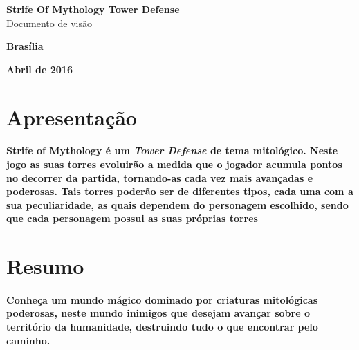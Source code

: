 \documentclass[11pt]{article} %
\begin{document}
\color{white}
\pagestyle{plain}

\begin{titlepage}
 \vfill
  \begin{center}
   {\textbf{{{\Huge  Strife Of Mythology Tower Defense}}}}\\[6cm]


   {{\huge Documento de visão}}\\[6cm]

   \hspace{.45\textwidth} %
  \vfill

\vspace{2cm}

\large \textbf{Brasília}

\large \textbf{Abril de 2016}
\end{center}
\end{titlepage}
\newpage

\color{white}
\section*{Apresentação}

\paragraph{}\textbf{Strife of Mythology é um \textit{Tower Defense} de tema mitológico. Neste jogo as suas torres evoluirão a medida que o jogador acumula pontos no decorrer da partida, tornando-as cada vez mais avançadas e poderosas. Tais torres poderão ser de diferentes tipos, cada uma com a sua peculiaridade, as quais dependem do personagem escolhido, sendo que cada personagem possui as suas próprias torres}

\section*{Resumo}

\paragraph{}\textbf{Conheça um mundo mágico dominado por criaturas mitológicas poderosas, neste mundo inimigos que desejam avançar sobre o território da humanidade, destruindo tudo o que encontrar pelo caminho.}
\end{document}
